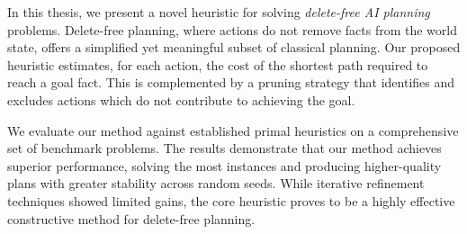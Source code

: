 \par In this thesis, we present a novel heuristic for solving \textit{delete-free AI planning} problems.
Delete-free planning, where actions do not remove facts from the world state, offers a simplified
yet meaningful subset of classical planning. Our proposed heuristic estimates, for each action,
the cost of the shortest path required to reach a goal fact. This is complemented by a pruning
strategy that identifies and excludes actions which do not contribute to achieving the goal.
\par We evaluate our method against established primal heuristics on a comprehensive set of benchmark problems.
The results demonstrate that our method achieves superior performance, solving the most instances and producing
higher-quality plans with greater stability across random seeds. While iterative refinement techniques
showed limited gains, the core heuristic proves to be a highly effective constructive method for delete-free
planning.
